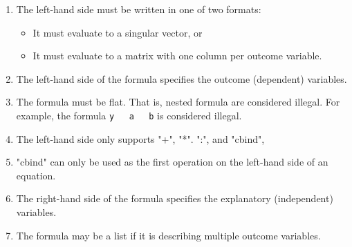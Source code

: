 \documentclass{article}
\begin{document}
\begin{enumerate}
  \item The left-hand side must be written in one of two formats:
    \begin{itemize}
      \item It must evaluate to a singular vector, or
      \item It must evaluate to a matrix with one column per outcome variable.
    \end{itemize}
  \item The left-hand side of the formula specifies the outcome (dependent) variables.
  \item The formula must be flat. That is, nested formula are considered
    illegal. For example, the formula {\tt y ~ a ~ b} is considered illegal.
  \item The left-hand side only supports "+", "*". ":", and "cbind",
  \item "cbind" can only be used as the first operation on the left-hand side of an equation.
  \item The right-hand side of the formula specifies the explanatory (independent) variables.
  \item The formula may be a list if it is describing multiple outcome variables.
\end{enumerate}
\end{document}
